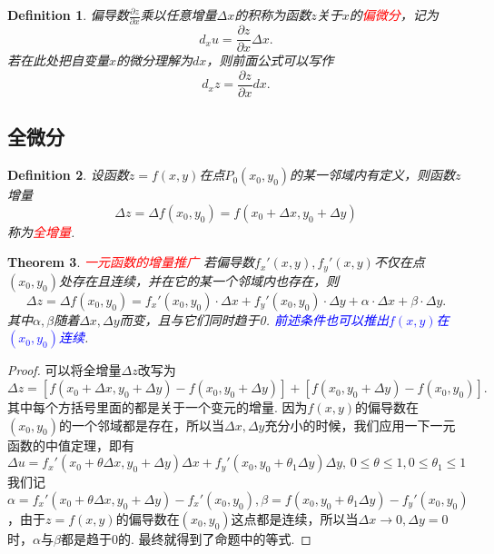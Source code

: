 \documentclass{article}
\newtheorem{theorem}{Theorem}[section]
\newtheorem{definition}[theorem]{Definition}
\newcommand{\redt}[1]{\textcolor{red}{#1}}
\newcommand{\bluet}[1]{\textcolor{blue}{#1}}
\begin{document}
\begin{definition}
\rm 偏导数$\frac{\partial z}{\partial x}$乘以任意增量$\Delta x$的积称为函数$z$关于$x$的\redt{偏微分}，记为
$$
d_x u =\frac{\partial z}{\partial x}\Delta x.
$$
若在此处把自变量$x$的微分理解为$dx$，则前面公式可以写作
$$
d_xz=\frac{\partial z}{\partial x}dx.
$$
\end{definition}

\newpage
\subsection{全微分}

\begin{definition}
\rm 设函数$z=f(x,y)$在点$P_0(x_0,y_0)$的某一邻域内有定义，则函数$z$增量
$$
\Delta z = \Delta f(x_0,y_0) = f(x_0+\Delta x, y_0+\Delta y)
$$
称为\redt{全增量}.
\end{definition}

\begin{theorem}\label{total-derivative: sufficient-cond}
\rm \redt{一元函数的增量推广} 若偏导数$f_x'(x,y),f_y'(x,y)$不仅在点$(x_0,y_0)$处存在且连续，并在它的某一个邻域内也存在，则
\begin{equation}
\Delta z = \Delta f(x_0,y_0) = f_x'(x_0,y_0)\cdot \Delta x + f_y'(x_0,y_0) \cdot \Delta y + \alpha\cdot\Delta x + \beta \cdot \Delta y.
\end{equation} 
其中$\alpha,\beta$随着$\Delta x, \Delta y$而变，且与它们同时趋于0. \bluet{前述条件也可以推出$f(x,y)$在$(x_0,y_0)$连续}. 
\end{theorem}

\begin{proof}
可以将全增量$\Delta z$改写为
$$
\Delta z = \left[f(x_0 + \Delta x, y_0 + \Delta y) - f(x_0,y_0 + \Delta y) \right]+ \left[f(x_0, y_0 + \Delta y) - f(x_0,y_0) \right]. 
$$
其中每个方括号里面的都是关于一个变元的增量. 因为$f(x,y)$的偏导数在$(x_0,y_0)$的一个邻域都是存在，所以当$\Delta x,\Delta y$充分小的时候，我们应用一下一元函数的中值定理，即有
$$
\Delta u = f_x'(x_0 + \theta\Delta x, y_0 + \Delta y)\Delta x + f_y'(x_0,y_0 + \theta_1 \Delta y)\Delta y,\, 0\leq \theta \leq 1,0\leq \theta_1 \leq 1
$$
我们记$\alpha = f_x'(x_0 + \theta\Delta x, y_0 + \Delta y) - f_x'(x_0, y_0),\beta = f(x_0, y_0 + \theta_1\Delta y)- f_y'(x_0, y_0)$，由于$z=f(x,y)$的偏导数在$(x_0,y_0)$这点都是连续，所以当$\Delta x \to 0,\Delta y = 0$时，$\alpha$与$\beta$都是趋于$0$的. 最终就得到了命题中的等式. 
\end{proof}
\end{document}
